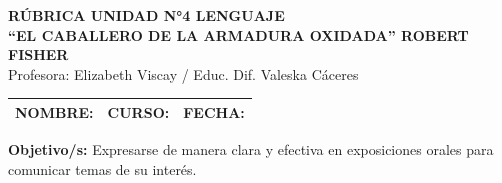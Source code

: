 \documentclass[9pt]{extarticle}
\begin{document}
\begin{center}
  {\large\bfseries RÚBRICA UNIDAD N°4 LENGUAJE}\\[2pt]
  {\bfseries “EL CABALLERO DE LA ARMADURA OXIDADA” ROBERT FISHER}\\[2pt]
  Profesora: Elizabeth Viscay / Educ. Dif. Valeska Cáceres
\end{center}

\vspace{2pt}
\begin{tabular}{|p{12.8cm}|p{6cm}|p{6.2cm}|}
\hline
\textbf{NOMBRE:} & \textbf{CURSO:} & \textbf{FECHA:} \\[8pt] \hline
\end{tabular}

\vspace{4pt}
\textbf{Objetivo/s:} Expresarse de manera clara y efectiva en exposiciones orales para comunicar temas de su interés.
\end{document}
